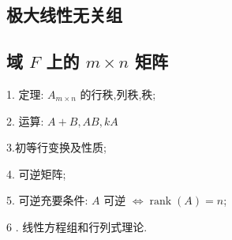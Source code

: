 \subsection{极大线性无关组}
\subsection{域 $ F $ 上的 $ m \times n $ 矩阵}
1. 定理: $ A_{m \times n} $ 的行秩,列秩,秩;

2. 运算: $ A+B, A B, k A $

3.初等行变换及性质;

4. 可逆矩阵;

5. 可逆充要条件: $ A $ 可逆 $ \Leftrightarrow \operatorname{rank}(A)=n $;

6 . 线性方程组和行列式理论.






